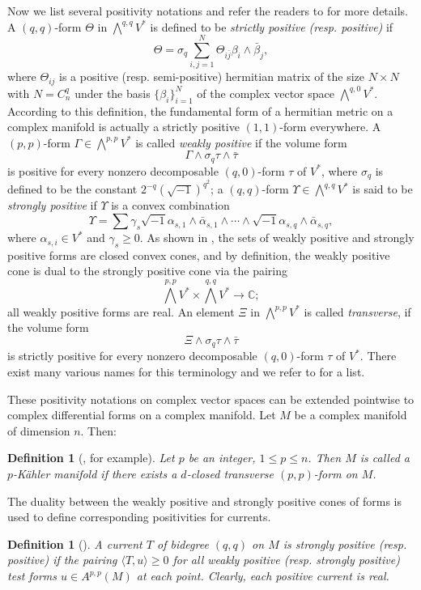 \documentclass[12pt]{amsart}
\numberwithin{equation}{section}
\newtheorem{definition}  [theorem]     {Definition}
\renewcommand{\1}{\mathds{1}}
\renewcommand{\>}{\rightarrow}
\def\b{\bar}
\begin{document}
Now we list several positivity notations and refer the readers to \cite{HK,H,Demailly} for more details. A $(q,q)$-form $\Theta$ in
$\bigwedge^{q,q}V^*$ is defined to be \emph{strictly positive (resp. positive)} if
\[ \Theta =\sigma_{q}\sum_{i,j=1}^N \Theta_{i\b j} \beta_i \wedge \b\beta_j,\]
where $\Theta_{ij}$ is a positive (resp. semi-positive) hermitian matrix of the size $N \times N$ with $N=C_{n}^q$ under the
basis $\{\beta_i \}_{i=1}^N$ of the complex vector space $\bigwedge^{q,0}V^*$.
According to this definition, the fundamental form of a hermitian metric on a complex manifold is actually a strictly positive $(1,1)$-form everywhere.
A $(p,p)$-form $\Gamma\in \bigwedge^{p,p}V^*$ is called
\emph{weakly positive}
if
the volume form $$\Gamma\wedge\sigma_{q}\tau\wedge\bar{\tau}$$ is
positive for every nonzero decomposable $(q,0)$-form $\tau$
of $V^*$, where $\sigma_{q}$ is defined to be the constant
$2^{-q}(\sqrt{-1})^{q^2}$;
a $(q,q)$-form $\Upsilon\in \bigwedge^{q,q}V^*$ is said to be \emph{strongly positive} if
$\Upsilon$ is a convex combination
$$\Upsilon=\sum\gamma_s \sqrt{-1}\alpha_{s,1}\wedge\bar\alpha_{s,1}\wedge\cdots\wedge\sqrt{-1}\alpha_{s,q}\wedge\bar\alpha_{s,q},$$
where $\alpha_{s,i}\in V^*$ and $\gamma_s\geq 0$.
As shown in \cite[Chapter III.\S\ 1.A]{Demailly},  the sets of weakly positive and strongly positive forms are closed convex cones,
 and by definition, the weakly positive cone is dual to the strongly positive cone via the pairing
$$\bigwedge^{p,p}V^*\times \bigwedge^{q,q}V^*\longrightarrow \mathbb{C};$$ all weakly positive forms
are real.
An element $\Xi$ in
$\bigwedge^{p,p}V^*$ is called \emph{transverse}, if
the volume form $$\Xi\wedge\sigma_{q}\tau\wedge\bar{\tau}$$ is
strictly positive for every nonzero decomposable $(q,0)$-form $\tau$
of $V^*$. There exist many various names for this
terminology and we refer to \cite[Appendix]{abb} for a list.

These positivity notations on complex vector spaces can be extended pointwise to
complex differential forms on a complex manifold.
Let $M$ be a complex manifold of dimension $n$. Then:

\begin{definition}[{\cite[Definition $1.11$]{aa}}, for example]
Let $p$ be an integer,
$1\leq p\leq n$. Then $M$ is called a \emph{$p$-K\"ahler manifold}
if there exists a $d$-closed transverse $(p,p)$-form on $M$.
\end{definition}

The duality between the weakly positive and strongly positive cones of forms is used to define
corresponding positivities for currents.
\begin{definition}[]\label{po-cur}
A current $T$ of bidegree $(q,q)$ on $M$ is strongly positive (resp. positive)
if the pairing $\langle T, u\rangle \geq 0$ for all weakly positive (resp. strongly positive) test forms
$u\in A^{p,p}(M)$ at each point. Clearly, each positive current is real.
\end{definition}
\end{document}
